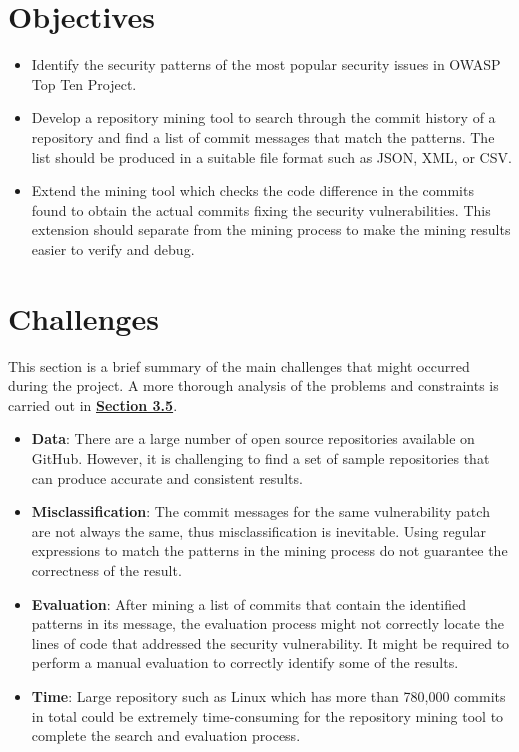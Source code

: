 \documentclass[12pt, a4paper]{report}
\begin{document}
\section{Objectives} \label{sec:objectives}
\begin{itemize}
	\item Identify the security patterns of the most popular security issues in OWASP Top Ten Project.
	\item Develop a repository mining tool to search through the commit history of a repository and
	find a list of commit messages that match the patterns. The list should be produced in a suitable
	file format such as JSON, XML, or CSV.
	\item Extend the mining tool which checks the code difference in the commits found to obtain the
	actual commits fixing the security vulnerabilities. This extension should separate from the mining
	process to make the mining results easier to verify and debug.
\end{itemize}

\section{Challenges} \label{sec:challenges}
This section is a brief summary of the main challenges that might occurred during the project. A
more thorough analysis of the problems and constraints is carried out in
\hyperref[sec:problems_and_constraints]{\textbf{Section 3.5}}.

\begin{itemize}
	\item \textbf{Data}: There are a large number of open source repositories available on GitHub.
	However, it is challenging to find a set of sample repositories that can produce accurate and
	consistent results.
	\item \textbf{Misclassification}: The commit messages for the same vulnerability patch are not
	always the same, thus misclassification is inevitable. Using regular expressions to match the
	patterns in the mining process do not guarantee the correctness of the result.
	\item \textbf{Evaluation}: After mining a list of commits that contain the identified patterns in
	its message, the evaluation process might not correctly locate the lines of code that addressed
	the security vulnerability. It might be required to perform a manual evaluation to correctly
	identify some of the results.
	\item \textbf{Time}: Large repository such as Linux which has more than 780,000 commits in total
	\cite{linux_repo} could be extremely time-consuming for the repository mining tool to complete the
	search and evaluation process.
\end{itemize}
\end{document}
